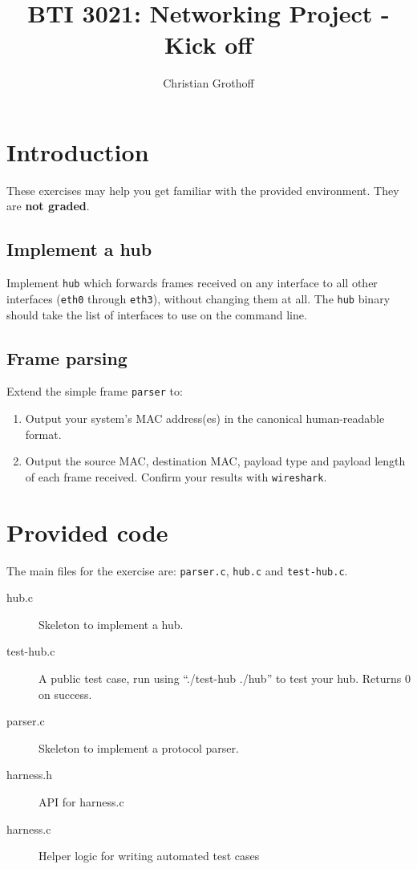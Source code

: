 \documentclass{article}
\title{BTI 3021: Networking Project - Kick off}
\author{Christian Grothoff}
\date{}
\begin{document}
\maketitle

\section{Introduction}

These exercises may help you get familiar with the provided environment.
They are {\bf not graded}.

\subsection{Implement a hub}

Implement {\tt hub} which forwards frames received on any interface to
all other interfaces ({\tt eth0} through {\tt eth3}), without changing
them at all.  The {\tt hub} binary should take the list of interfaces
to use on the command line.

\subsection{Frame parsing}

Extend the simple frame {\tt parser} to:
\begin{enumerate}
\item Output your system's MAC address(es) in the canonical human-readable format.
\item Output the source MAC, destination MAC, payload type and payload length
  of each frame received. Confirm your results with {\tt wireshark}.
\end{enumerate}



\section{Provided code}



The main files for the exercise are: {\tt parser.c},
{\tt hub.c} and {\tt test-hub.c}.

\begin{description}
  \item[hub.c] Skeleton to implement a hub.
  \item[test-hub.c] A public test case, run using ``./test-hub ./hub'' to test your hub. Returns 0 on success.
  \item[parser.c] Skeleton to implement a protocol parser.
  \item[harness.h] API for harness.c
  \item[harness.c] Helper logic for writing automated test cases
\end{description}
\end{document}
